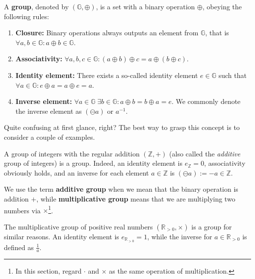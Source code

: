 \documentclass[../lecture-notes-148x210.tex]{subfiles}
\begin{document}
\begin{definition}
    A \textbf{group}, denoted by $(\mathbb{G}, \oplus)$, is a set with a binary operation $\oplus$, obeying the following rules:
    \begin{enumerate}
        \item \textbf{Closure:} Binary operations always outputs an element from $\mathbb{G}$, that is $\forall a,b \in \mathbb{G}: a \oplus b \in \mathbb{G}$.
        \item \textbf{Associativity:} $\forall a,b,c \in \mathbb{G}: (a \oplus b)\oplus c = a \oplus (b \oplus c)$.
        \item \textbf{Identity element:} There exists a so-called identity element $e \in \mathbb{G}$ such that $\forall a \in \mathbb{G}: e \oplus a = a \oplus e = a$.
        \item \textbf{Inverse element:} $\forall a \in \mathbb{G} \; \exists b \in \mathbb{G}: a\oplus b = b \oplus a = e$. We commonly denote the inverse element as $(\ominus a)$ or $a^{-1}$.
    \end{enumerate}
\end{definition}

Quite confusing at first glance, right? The best way to grasp this concept is to consider a couple of examples.

\begin{example}
    A group of integers with the regular addition $(\mathbb{Z},+)$ (also called the \textit{additive} group of integers) is a group. Indeed, an identity element is $e_{\mathbb{Z}}=0$, associativity obviously holds, and an inverse for each element $a \in \mathbb{Z}$ is $(\ominus a) := -a \in \mathbb{Z}$. 
\end{example}

\begin{remark}
    We use the term \textbf{additive group} when we mean that the binary operation is addition $+$, while \textbf{multiplicative group} means that we are multiplying two numbers via $\times$\footnote{In this section, regard $\cdot$ and $\times$ as the same operation of multiplication.}.
\end{remark}

\begin{example}
    The multiplicative group of positive real numbers $(\mathbb{R}_{> 0}, \times)$ is a group for similar reasons. An identity element is $e_{\mathbb{R}_{>0}} = 1$, while the inverse for $a \in \mathbb{R}_{>0}$ is defined as $\frac{1}{a}$.
\end{example}
\end{document}
